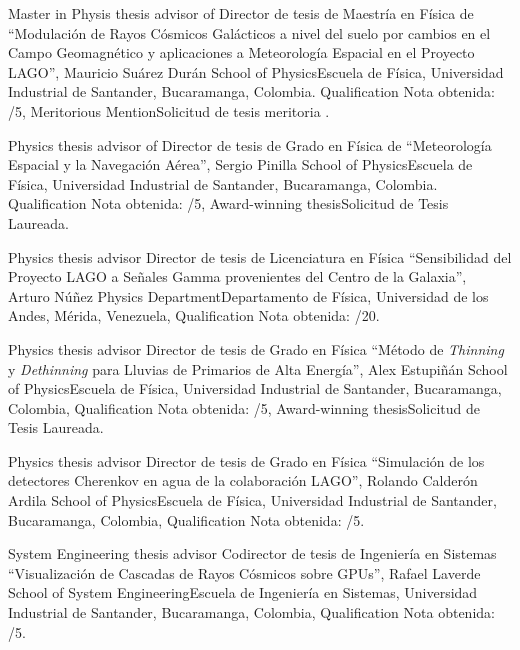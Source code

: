 \ifeng
Master in Physis thesis advisor of
 \else
Director de tesis de Maestría en Física de
 \fi
``Modulación de Rayos Cósmicos Galácticos a nivel del suelo por cambios en el Campo Geomagnético y aplicaciones a Meteorología Espacial en el Proyecto LAGO'', Mauricio Suárez Durán \at \ifeng School of Physics\else Escuela de Física\fi, Universidad Industrial de Santander, Bucaramanga, Colombia. \ifeng Qualification \else Nota obtenida: /5, \ifeng Meritorious Mention\else Solicitud de tesis meritoria \fi.

\ifeng
Physics thesis advisor of
 \else
Director de tesis de Grado en Física de
 \fi
``Meteorología Espacial y la Navegación Aérea'', Sergio Pinilla \at \ifeng School of Physics\else Escuela de Física\fi, Universidad Industrial de Santander, Bucaramanga, Colombia.  \ifeng Qualification \else Nota obtenida: /5, \ifeng Award-winning thesis\else Solicitud de Tesis Laureada\fi.

\ifeng
Physics thesis advisor
 \else
Director de tesis de Licenciatura en Física
 \fi
``Sensibilidad del Proyecto LAGO a Señales Gamma provenientes del Centro de la Galaxia'', Arturo Núñez \at \ifeng Physics Department\else Departamento de Física\fi, Universidad de los Andes, Mérida, Venezuela, \ifeng Qualification \else Nota obtenida: /20.

\ifeng
Physics thesis advisor
 \else
Director de tesis de Grado en Física
 \fi
``Método de {\textit{Thinning}} y {\textit{Dethinning}} para Lluvias de Primarios de Alta Energía'', Alex Estupiñán \at \ifeng School of Physics\else Escuela de Física\fi, Universidad Industrial de Santander, Bucaramanga, Colombia, \ifeng Qualification \else Nota obtenida: /5, \ifeng Award-winning thesis\else Solicitud de Tesis Laureada\fi.

\ifeng
Physics thesis advisor
 \else
Director de tesis de Grado en Física
 \fi
``Simulación de los detectores Cherenkov en agua de la colaboración LAGO'', Rolando Calderón Ardila \at \ifeng School of Physics\else Escuela de Física\fi, Universidad Industrial de Santander, Bucaramanga, Colombia, \ifeng Qualification \else Nota obtenida: /5. 

\ifeng
System Engineering thesis advisor
 \else
Codirector de tesis de Ingeniería en Sistemas
 \fi
``Visualización de Cascadas de Rayos Cósmicos sobre GPUs'', Rafael Laverde \at \ifeng School of System Engineering\else Escuela de Ingeniería en Sistemas\fi, Universidad Industrial de Santander, Bucaramanga, Colombia, \ifeng Qualification \else Nota obtenida: /5.

